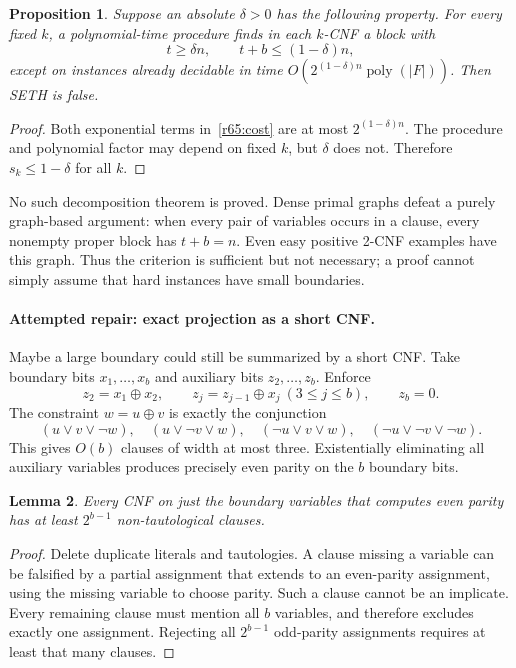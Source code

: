 \documentclass[11pt,a4paper]{article}
\newtheorem{notebooklemma}{Lemma}[section]
\newtheorem{notebookproposition}[notebooklemma]{Proposition}
\numberwithin{equation}{section}
\begin{document}
\begin{notebookproposition}\label{r65:block}
Suppose an absolute $\delta>0$ has the following property. For every fixed $k$, a polynomial-time procedure finds in each $k$-CNF a block with
\[
 t\ge\delta n,\qquad t+b\le(1-\delta)n,
\]
except on instances already decidable in time $O(2^{(1-\delta)n}\operatorname{poly}(|F|))$. Then SETH is false.
\end{notebookproposition}
\begin{proof}
Both exponential terms in~\eqref{r65:cost} are at most $2^{(1-\delta)n}$. The procedure and polynomial factor may depend on fixed $k$, but $\delta$ does not. Therefore $s_k\le1-\delta$ for all $k$.
\end{proof}

No such decomposition theorem is proved. Dense primal graphs defeat a purely graph-based argument: when every pair of variables occurs in a clause, every nonempty proper block has $t+b=n$. Even easy positive 2-CNF examples have this graph. Thus the criterion is sufficient but not necessary; a proof cannot simply assume that hard instances have small boundaries.

\paragraph{Attempted repair: exact projection as a short CNF.}
Maybe a large boundary could still be summarized by a short CNF. Take boundary bits $x_1,\ldots,x_b$ and auxiliary bits $z_2,\ldots,z_b$. Enforce
\[
 z_2=x_1\oplus x_2,\qquad z_j=z_{j-1}\oplus x_j\ (3\le j\le b),
 \qquad z_b=0.
\]
The constraint $w=u\oplus v$ is exactly the conjunction
\[
 (u\vee v\vee\neg w),\quad(u\vee\neg v\vee w),\quad
 (\neg u\vee v\vee w),\quad(\neg u\vee\neg v\vee\neg w).
\]
This gives $O(b)$ clauses of width at most three. Existentially eliminating all auxiliary variables produces precisely even parity on the $b$ boundary bits.

\begin{notebooklemma}\label{r65:parity}
Every CNF on just the boundary variables that computes even parity has at least $2^{b-1}$ non-tautological clauses.
\end{notebooklemma}
\begin{proof}
Delete duplicate literals and tautologies. A clause missing a variable can be falsified by a partial assignment that extends to an even-parity assignment, using the missing variable to choose parity. Such a clause cannot be an implicate. Every remaining clause must mention all $b$ variables, and therefore excludes exactly one assignment. Rejecting all $2^{b-1}$ odd-parity assignments requires at least that many clauses.
\end{proof}
\end{document}
